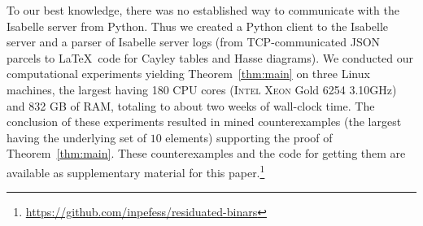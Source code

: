 \documentclass{easychair}
\begin{document}
To our best knowledge, there was no established way to communicate with the Isabelle server from Python. Thus we created a Python client to the Isabelle server \cite{isabelle-client} and a parser of Isabelle server logs (from TCP-communicated JSON parcels to \LaTeX\ code for Cayley tables and Hasse diagrams). We conducted our computational experiments yielding Theorem~\ref{thm:main} on three Linux machines, the largest having 180 CPU cores (\textsc{Intel}\textsuperscript{\textregistered} \textsc{Xeon}\textsuperscript{\textregistered} Gold 6254 3.10GHz) and 832 GB of RAM, totaling to about two weeks of wall-clock time. The conclusion of these experiments resulted in mined counterexamples (the largest having the underlying set of $10$ elements) supporting the proof of Theorem~\ref{thm:main}. These counterexamples and the code for getting them are available as supplementary material for this paper.\footnote{\url{https://github.com/inpefess/residuated-binars}}

\label{sect:bib}


\end{document}

